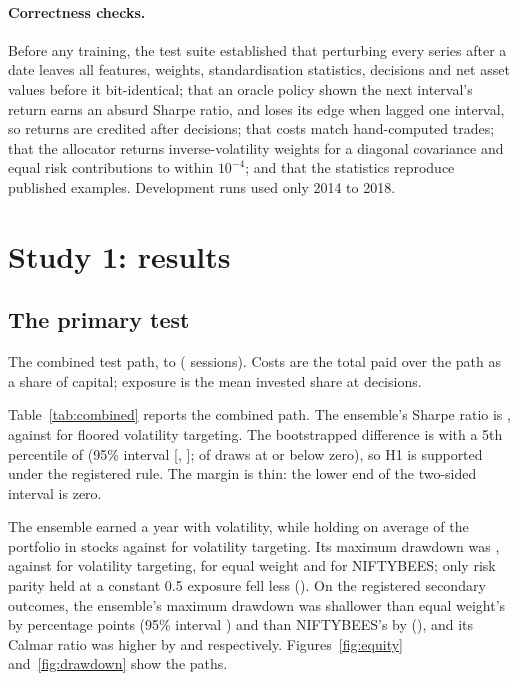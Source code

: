 \documentclass[11pt]{article}
\newcommand{\gtab}[1]{\begin{adjustbox}{max width=\linewidth}\end{adjustbox}}
\begin{document}
\paragraph{Correctness checks.} Before any training, the test suite established that perturbing every series after a date leaves all features, weights, standardisation statistics, decisions and net asset values before it bit-identical; that an oracle policy shown the next interval's return earns an absurd Sharpe ratio, and loses its edge when lagged one interval, so returns are credited after decisions; that costs match hand-computed trades; that the allocator returns inverse-volatility weights for a diagonal covariance and equal risk contributions to within $10^{-4}$; and that the statistics reproduce published examples. Development runs used only 2014 to 2018.

\section{Study 1: results}\label{sec:results}

\subsection{The primary test}

\begin{table}[t]
\centering\small
\caption{The combined test path, \PathStart{} to \PathEnd{} (\NSessions{} sessions). Costs are the total paid over the path as a share of capital; exposure is the mean invested share at decisions.}
\label{tab:combined}
\gtab{tab_combined.tex}
\end{table}

Table~\ref{tab:combined} reports the combined path. The ensemble's Sharpe ratio is \SRppo{}, against \SRvt{} for floored volatility targeting. The bootstrapped difference is \HiDelta{} with a 5th percentile of \HiPfive{} (95\% interval [\HiLo, \HiHi]; \HiShare{} of draws at or below zero), so H1 is supported under the registered rule. The margin is thin: the lower end of the two-sided interval is zero.

The ensemble earned \CAGRppo{} a year with \VOLppo{} volatility, while holding on average \EXPppo{} of the portfolio in stocks against \EXPvt{} for volatility targeting. Its maximum drawdown was \MDDppo{}, against \MDDvt{} for volatility targeting, \MDDew{} for equal weight and \MDDbees{} for NIFTYBEES; only risk parity held at a constant 0.5 exposure fell less (\MDDrpA{}). On the registered secondary outcomes, the ensemble's maximum drawdown was shallower than equal weight's by \SecMddEWpp{} percentage points (95\% interval \SecMddEWppCI) and than NIFTYBEES's by \SecMddBeespp{} (\SecMddBeesppCI), and its Calmar ratio was higher by \SecCalEW{} \SecCalEWCI{} and \SecCalBees{} \SecCalBeesCI{} respectively. Figures~\ref{fig:equity} and~\ref{fig:drawdown} show the paths.
\end{document}
